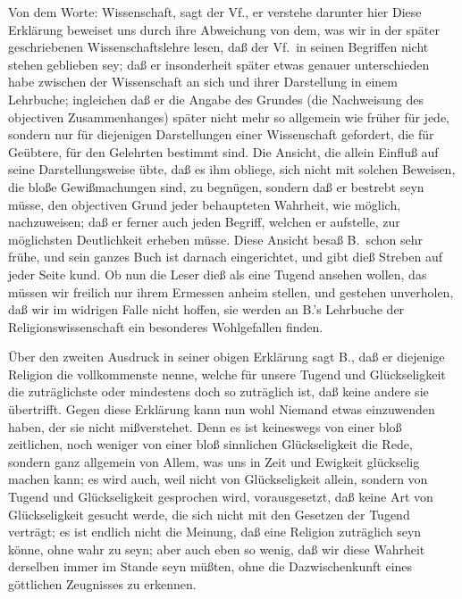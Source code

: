 Von dem Worte: Wissenschaft, sagt der Vf., er verstehe darunter hier  Diese Erklärung beweiset uns durch ihre Abweichung von dem, was wir in der später geschriebenen Wissenschaftslehre lesen, daß der Vf.\ in seinen Begriffen nicht stehen geblieben sey; daß er insonderheit später etwas genauer unterschieden habe zwischen der Wissenschaft an sich und ihrer Darstellung in einem Lehrbuche; ingleichen daß er die Angabe des Grundes (die Nachweisung des objectiven Zusammenhanges) später nicht mehr so allgemein wie früher für jede, sondern nur für diejenigen Darstellungen einer Wissenschaft gefordert, die für Geübtere, für den Gelehrten bestimmt sind. Die Ansicht, die allein Einfluß auf seine Darstellungsweise übte, daß es ihm obliege, sich nicht mit solchen Beweisen, die bloße Gewißmachungen sind, zu begnügen, sondern daß er bestrebt seyn müsse, den objectiven Grund jeder behaupteten Wahrheit, wie möglich, nachzuweisen; daß er ferner auch jeden Begriff, welchen er aufstelle, zur möglichsten Deutlichkeit erheben müsse. Diese Ansicht besaß B.\ schon sehr frühe, und sein ganzes Buch ist darnach eingerichtet, und gibt dieß Streben auf jeder Seite kund. Ob nun die Leser dieß als eine Tugend ansehen wollen, das müssen wir freilich nur ihrem Ermessen anheim stellen, und gestehen unverholen, daß wir im widrigen Falle nicht hoffen, sie werden an B.'s Lehrbuche der Religionswissenschaft ein besonderes Wohlgefallen finden. \par 
Über den zweiten Ausdruck in seiner obigen Erklärung sagt B., daß er diejenige Religion die vollkommenste nenne, welche für unsere Tugend und Glückseligkeit die zuträglichste oder mindestens doch so zuträglich ist, daß keine andere sie übertrifft. Gegen diese Erklärung kann nun wohl Niemand etwas einzuwenden haben, der sie nicht mißverstehet. Denn es ist keineswegs von einer bloß zeitlichen, noch weniger von einer bloß sinnlichen Glückseligkeit die Rede, sondern ganz allgemein von Allem, was uns in Zeit und Ewigkeit glückselig machen kann; es wird auch, weil nicht von Glückseligkeit  allein, sondern von Tugend und Glückseligkeit gesprochen wird, vorausgesetzt, daß keine Art von Glückseligkeit gesucht werde, die sich nicht mit den Gesetzen der Tugend verträgt; es ist endlich nicht die Meinung, daß eine Religion zuträglich seyn könne, ohne wahr zu seyn; aber auch eben so wenig, daß wir diese Wahrheit derselben immer im Stande seyn müßten, ohne die Dazwischenkunft eines göttlichen Zeugnisses zu erkennen. \par 
